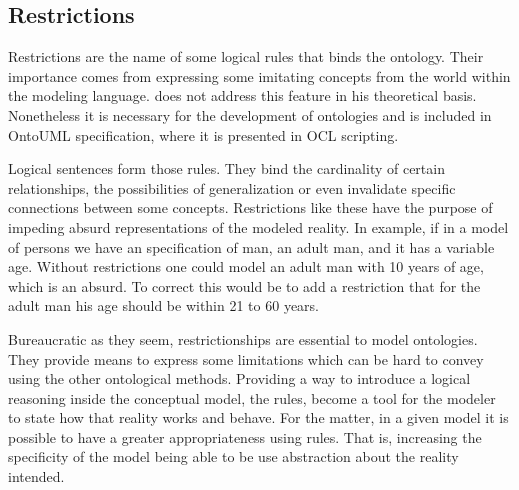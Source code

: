 \subsection{Restrictions}

Restrictions are the name of some logical rules that binds the ontology. Their importance comes from expressing some imitating concepts from the world within the modeling language.  \cite{guizzardi_ontological_2005} does not address this feature in his theoretical basis. Nonetheless it is necessary for the development of ontologies and is included in OntoUML specification, where it is presented in OCL scripting. \citep{guizzardi_ontoUML_2004}

Logical sentences form those rules. They bind the cardinality of certain relationships, the possibilities of generalization or even invalidate specific connections between some concepts. Restrictions like these have the purpose of impeding absurd representations of the modeled reality. In example, if in a model of persons we have an specification of man, an adult man, and it has a variable age. Without restrictions one could model an adult man with 10 years of age, which is an absurd. To correct this would be to add a restriction that for the adult man his age should be within 21 to 60 years.

Bureaucratic as they seem, restrictionships are essential to model ontologies. They provide means to express some limitations which can be hard to convey using the other ontological methods. Providing a way to introduce a logical reasoning inside the conceptual model, the rules, become a tool for the modeler to state how that reality works and behave. For the matter, in a given model it is possible to have a greater appropriateness using rules. That is, increasing the specificity of the model being able to be use abstraction about the reality intended.